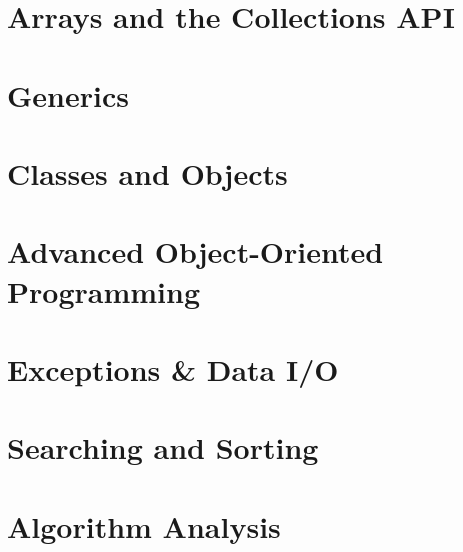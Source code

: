 \chapter{Arrays and the Collections API}
\thispagestyle{chapterstart}
\pagestyle{otherpages}
\label{chapter-arrays-collections}
\setcounter{excounter}{1}


\chapter{Generics}
\thispagestyle{chapterstart}
\pagestyle{otherpages}
\label{chapter-generics}
\setcounter{excounter}{1}


\chapter{Classes and Objects}
\thispagestyle{chapterstart}
\pagestyle{otherpages}
\label{chapter-classes}
\setcounter{excounter}{1}


\chapter{Advanced Object-Oriented Programming}
\thispagestyle{chapterstart}
\pagestyle{otherpages}
\label{chapter-advanced-oop}
\setcounter{excounter}{1}


\chapter{Exceptions \& Data I/O}
\thispagestyle{chapterstart}
\pagestyle{otherpages}
\label{chapter-exceptions-io}
\setcounter{excounter}{1}


\chapter{Searching and Sorting}
\thispagestyle{chapterstart}
\pagestyle{otherpages}
\label{chapter-searching-sorting}
\setcounter{excounter}{1}


\chapter{Algorithm Analysis}
\thispagestyle{chapterstart}
\pagestyle{otherpages}
\label{chapter-algorithms}
\setcounter{excounter}{1}


